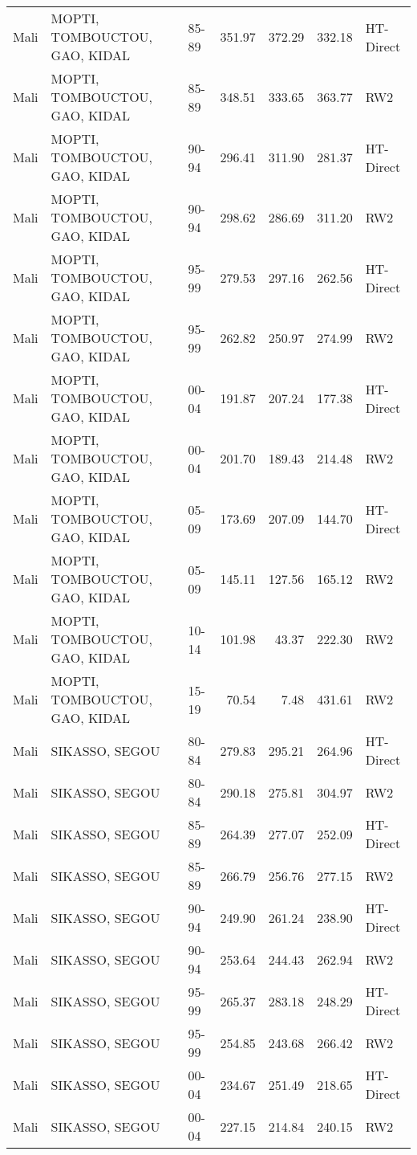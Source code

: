 \begin{longtable}{lllrrrl}
  Mali & MOPTI, TOMBOUCTOU, GAO, KIDAL & 85-89 & 351.97 & 372.29 & 332.18 & HT-Direct \\ 
  Mali & MOPTI, TOMBOUCTOU, GAO, KIDAL & 85-89 & 348.51 & 333.65 & 363.77 & RW2 \\ 
  Mali & MOPTI, TOMBOUCTOU, GAO, KIDAL & 90-94 & 296.41 & 311.90 & 281.37 & HT-Direct \\ 
  Mali & MOPTI, TOMBOUCTOU, GAO, KIDAL & 90-94 & 298.62 & 286.69 & 311.20 & RW2 \\ 
  Mali & MOPTI, TOMBOUCTOU, GAO, KIDAL & 95-99 & 279.53 & 297.16 & 262.56 & HT-Direct \\ 
  Mali & MOPTI, TOMBOUCTOU, GAO, KIDAL & 95-99 & 262.82 & 250.97 & 274.99 & RW2 \\ 
  Mali & MOPTI, TOMBOUCTOU, GAO, KIDAL & 00-04 & 191.87 & 207.24 & 177.38 & HT-Direct \\ 
  Mali & MOPTI, TOMBOUCTOU, GAO, KIDAL & 00-04 & 201.70 & 189.43 & 214.48 & RW2 \\ 
  Mali & MOPTI, TOMBOUCTOU, GAO, KIDAL & 05-09 & 173.69 & 207.09 & 144.70 & HT-Direct \\ 
  Mali & MOPTI, TOMBOUCTOU, GAO, KIDAL & 05-09 & 145.11 & 127.56 & 165.12 & RW2 \\ 
  Mali & MOPTI, TOMBOUCTOU, GAO, KIDAL & 10-14 & 101.98 & 43.37 & 222.30 & RW2 \\ 
  Mali & MOPTI, TOMBOUCTOU, GAO, KIDAL & 15-19 & 70.54 & 7.48 & 431.61 & RW2 \\ 
  Mali & SIKASSO, SEGOU & 80-84 & 279.83 & 295.21 & 264.96 & HT-Direct \\ 
  Mali & SIKASSO, SEGOU & 80-84 & 290.18 & 275.81 & 304.97 & RW2 \\ 
  Mali & SIKASSO, SEGOU & 85-89 & 264.39 & 277.07 & 252.09 & HT-Direct \\ 
  Mali & SIKASSO, SEGOU & 85-89 & 266.79 & 256.76 & 277.15 & RW2 \\ 
  Mali & SIKASSO, SEGOU & 90-94 & 249.90 & 261.24 & 238.90 & HT-Direct \\ 
  Mali & SIKASSO, SEGOU & 90-94 & 253.64 & 244.43 & 262.94 & RW2 \\ 
  Mali & SIKASSO, SEGOU & 95-99 & 265.37 & 283.18 & 248.29 & HT-Direct \\ 
  Mali & SIKASSO, SEGOU & 95-99 & 254.85 & 243.68 & 266.42 & RW2 \\ 
  Mali & SIKASSO, SEGOU & 00-04 & 234.67 & 251.49 & 218.65 & HT-Direct \\ 
  Mali & SIKASSO, SEGOU & 00-04 & 227.15 & 214.84 & 240.15 & RW2 \\ 

\end{longtable}
